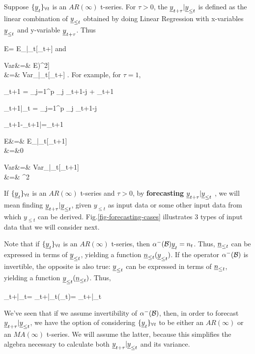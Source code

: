 Suppose
$\tseries{\rvy_t}$
is an $AR(\infty)$ t-series. For $\tau>0$,
the 
$\rvy_{t+\tau}|\rvy_{\leq t}$
is defined as the
linear combination of $\rvy_{\leq t}$
obtained by doing
Linear Regression
with x-variables
$\rvy_{\leq t}$
and y-variable
$\rvy_{t+\tau}$. Thus

\beq
E
=
E_{|\rvy_{\leq t}}[\rvy_{t+\tau}]
\eeq
and

\beqa
Var&=&
E\left[
\left(\rvy_{t+\tau}|\rvy_{\leq t}
-E[\rvy_{t+\tau}|\rvy_{\leq t}]
\right)^2\right]
\\
&=&
Var_{|\rvy_{\leq t}}[\rvy_{t+\tau}]
\;.
\eeqa
For example, for $\tau=1$,


\beq
\rvy_{t+1} = \sum_{j=1}^p \alp_j \rvy_{t+1-j}
+ \rvn_{t+1}
\eeq

\beq
\rvy_{t+1}|\rvy_{\leq t} =
\sum_{j=1}^p \alp_j \rvy_{t+1-j}
\eeq

\beq
\rvy_{t+1}-\rvy_{t+1|}=\rvn_{t+1}
\eeq

\beqa
E&=&
E_{|\rvy_{\leq t}}[\rvy_{t+1}]
\\
&=&0
\eeqa

\beqa
Var
&=&
Var_{|\rvy_{\leq t}}[\rvy_{t+1}]
\\
&=& \s^2
\eeqa

If $\tseries{\rvy_t}$
is an $AR(\infty)$
t-series and $\tau>0$,
by {\bf forecasting} $\rvy_{t+\tau}|\rvy_{\leq t}$ ,
we will mean
finding $\rvy_{t+\tau}|\rvy_{\leq t}$,
given
$y_{\leq t}$
as input data
or some other input data
from which $y_{\leq t}$
can be derived.
Fig.\ref{fig-forecasting-cases}
illustrates 3 types
of input
data that we will consider
next.



Note that if $\tseries{\rvy_t}$
is an $AR(\infty)$
t-series,
then $\alp^-(\calb)\rvy_t=n_t$.
Thus, $\rvn_{\leq t}$
can be expressed in terms
of $\rvy_{\leq t}$,
yielding a function
$\rvn_{\leq t}(\rvy_{\leq t})$.
If the operator
$\alpha^-({\cal B})$
is invertible,
the opposite is also true: $\rvy_{\leq t}$
can be expressed in terms
of $\rvn_{\leq t}$,
yielding a function
$\rvy_{\leq t}(\rvn_{\leq t})$.
Thus,

\beq
\rvy_{t+\tau}|\rvy_{\leq t}=
\rvy_{t+\tau}|\rvy_{\leq t}(\rvn_{\leq t})=
\rvy_{t+\tau}|\rvn_{\leq t}
\eeq

We've
seen that
 if we
assume invertibility
of $\alpha^-({\cal B})$, then,
in order
to forecast $\rvy_{t+\tau}|\rvy_{\leq t}$,
we have the option
of considering $\tseries{\rvy_t}$ to be
either an $AR(\infty)$
or an $MA(\infty)$
t-series. We will assume
the latter,
because this
simplifies
the algebra
necessary to calculate
both
$\rvy_{t+\tau}|\rvy_{\leq t}$
and its
variance.


